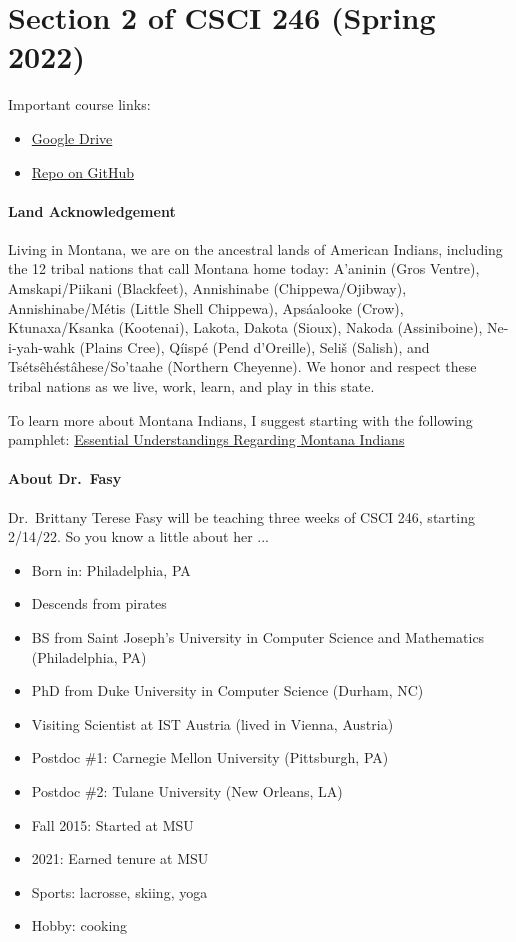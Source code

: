 \section*{Section 2 of CSCI 246 (Spring 2022)}

Important course links:
\begin{itemize}
    \item \href{https://drive.google.com/drive/folders/15M83uQne8Y-jddRmr5QYIur-tM_K77VQ?usp=sharing}{Google
    Drive}
    \item \href{https://github.com/msu/csci-246-spring2022}{Repo on GitHub}
\end{itemize}

\paragraph{Land Acknowledgement}

Living in Montana, we are on the ancestral lands of American Indians, including
the 12 tribal nations that call Montana home today: A’aninin (Gros Ventre),
Amskapi/Piikani (Blackfeet), Annishinabe (Chippewa/Ojibway), Annishinabe/M\'etis
(Little Shell Chippewa), Apsáalooke (Crow), Ktunaxa/Ksanka (Kootenai), Lakota,
Dakota (Sioux), Nakoda (Assiniboine), Ne-i-yah-wahk (Plains Cree), Qíispé (Pend
d’Oreille), Seli\v{s} (Salish), and Tsétsêhéstâhese/So’taahe (Northern Cheyenne).
We honor and respect these tribal nations as we live, work, learn, and play in
this state.

To learn more about Montana Indians, I suggest starting with the following
pamphlet:
\href{http://opi.mt.gov/Portals/182/Page%20Files/Indian%20Education/Indian%20Education%20101/essentialunderstandings.df}{Essential Understandings Regarding Montana Indians}


\paragraph{About Dr.~Fasy}
Dr.~Brittany Terese Fasy will be teaching three weeks of CSCI 246, starting
2/14/22.  So you know a little about her ...

\begin{itemize}
    \item Born in: Philadelphia, PA
    \item Descends from pirates
    \item BS from Saint Joseph's University in Computer Science and Mathematics
        (Philadelphia, PA)
    \item PhD from Duke University in Computer Science (Durham, NC)
    \item Visiting Scientist at IST Austria (lived in Vienna, Austria)
    \item Postdoc \#1: Carnegie Mellon University (Pittsburgh, PA)
    \item Postdoc \#2: Tulane University (New Orleans, LA)
    \item Fall 2015: Started at MSU
    \item 2021: Earned tenure at MSU
    \item Sports: lacrosse, skiing, yoga
    \item Hobby: cooking
\end{itemize}

